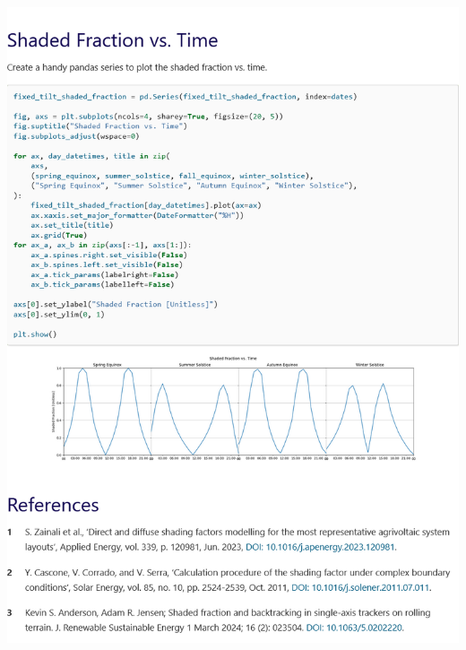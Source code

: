 \begin{myparindent}{0pt}
\includegraphics[width=\linewidth,height=0.9\textheight,keepaspectratio]{images/docs_examples_cut/shading_anim_3.png}

\end{myparindent}
